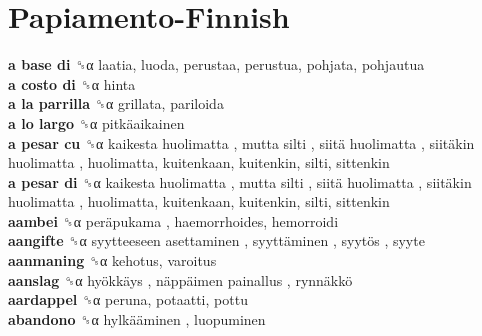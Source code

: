 \twocolumn
\chapter{Papiamento-Finnish}
\small
\raggedright
{}\textbf{a base di} ␝α  laatia, luoda, perustaa, perustua, pohjata, pohjautua  \\
\textbf{a costo di} ␝α  hinta  \\
\textbf{a la parrilla} ␝α  grillata, pariloida  \\
\textbf{a lo largo} ␝α   pitkäaikainen   \\
\textbf{a pesar cu} ␝α   kaikesta huolimatta ,  mutta silti ,  siitä huolimatta ,  siitäkin huolimatta , huolimatta, kuitenkaan, kuitenkin, silti, sittenkin  \\
\textbf{a pesar di} ␝α   kaikesta huolimatta ,  mutta silti ,  siitä huolimatta ,  siitäkin huolimatta , huolimatta, kuitenkaan, kuitenkin, silti, sittenkin  \\
\textbf{aambei} ␝α   peräpukama , haemorrhoides, hemorroidi  \\
\textbf{aangifte} ␝α   syytteeseen asettaminen ,  syyttäminen ,  syytös , syyte  \\
\textbf{aanmaning} ␝α  kehotus, varoitus  \\
\textbf{aanslag} ␝α   hyökkäys ,  näppäimen painallus ,  rynnäkkö   \\
\textbf{aardappel} ␝α  peruna, potaatti, pottu  \\
\textbf{abandono} ␝α   hylkääminen , luopuminen  \\
